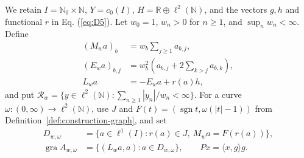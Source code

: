 \documentclass[11pt]{article}
\newcommand{\R}{\mathbb R}
\newcommand{\N}{\mathbb N}
\newcommand{\Nzero}{\mathbb N_0}
\newcommand{\gra}{\operatorname{gra}}
\newcommand{\sgn}{\operatorname{sgn}}
\newcommand{\pair}[2]{\langle #1,#2\rangle}
\theoremstyle{definition}
\theoremstyle{remark}
\begin{document}
We retain $I=\Nzero\times\N$, $Y=c_0(I)$, $H=\R\oplus\ell^2(\N)$, and the vectors $g,h$ and functional $r$ in Eq. (\ref{eq:D5}). Let $w_0=1$, $w_n>0$ for $n\ge1$, and $\sup_n w_n<\infty$. Define
\begin{equation}
\begin{aligned}
(M_wa)_b&=w_b\sum_{j\ge1}a_{b,j},\\
(E_wa)_{b,j}&=w_b^2\left(a_{b,j}+2\sum_{k>j}a_{b,k}\right),\\
L_wa&=-E_wa+r(a)h,
\end{aligned}
\label{eq:family-weighted-maps}
\end{equation}
and put $\mathcal R_w=\{y\in\ell^2(\N):\sum_{n\ge1}|y_n|/w_n<\infty\}$. For a curve $\omega:(0,\infty)\to\ell^2(\N)$, use $J$ and $F(t)=(\sgn t,\omega(|t|-1))$ from Definition~\ref{def:construction-graph}, and set
\begin{equation}
\begin{aligned}
D_{w,\omega}&=\{a\in\ell^1(I):r(a)\in J,\ M_wa=F(r(a))\},\\
\gra A_{w,\omega}&=\{(L_wa,a):a\in D_{w,\omega}\},
\qquad Px=\pair{x}{g}g.
\end{aligned}
\label{eq:family-weighted-graph}
\end{equation}
\end{document}
